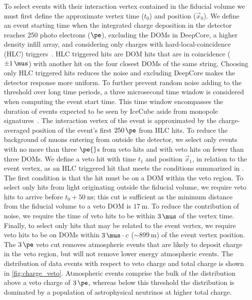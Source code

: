To select events with their interaction vertex contained in the fiducial volume we must first define the approximate vertex time ($t_0$) and position ($\vec{x}_0$).
We define an event starting time when the integrated charge deposition in the detector reaches 250 photo electrons ($\si\pe$), excluding the DOMs in DeepCore, a higher density infill array, and considering only charges with hard-local-coincidence (HLC) triggers~\cite{Achterberg:2006md,Abbasi:2008aa,Aartsen:2016nxy}.
HLC triggered hits are DOM hits that are in coincidence ($\pm\SI{1}\mus$) with another hit on the four closest DOMs of the same string.
Choosing only HLC triggered hits reduces the noise and excluding DeepCore makes the detector response more uniform.
To further prevent random noise adding to the threshold over long time periods, a three microsecond time window is considered when computing the event start time.
This time window encompasses the duration of events expected to be seen by IceCube aside from monopole signatures~\cite{Lauber:2018ntx,Aartsen:2015exf,Aartsen:2014awd}.
The interaction vertex of the event is approximated by the charge-averaged position of the event's first $\SI{250}\pe$ from HLC hits.
To reduce the background of muons entering from outside the detector, we select only events with no more than three $\si\pe{}$s from veto hits and with veto hits on fewer than three DOMs.
We define a veto hit with time $t_1$ and position $\vec{x}_1$, in relation to the event vertex, as an HLC triggered hit that meets the conditions summarized in .
The first condition is that the hit must be on a DOM within the veto region.
To select only hits from light originating outside the fiducial volume, we require veto hits to arrive before $t_0+\SI{50}\ns$; this cut is sufficient as the minimum distance from the fiducial volume to a veto DOM is $\SI{17}\meter$.
To reduce the contribution of noise, we require the time of veto hits to be within $\SI{3}\mus$ of the vertex time.
Finally, to select only hits that may be related to the event vertex, we require veto hits to be on DOMs within $\SI{3}\mus \cdot c$ ($\sim\SI{899}\meter$) of the event vertex position.
The $\SI{3}\pe$ veto cut removes atmospheric events that are likely to deposit charge in the veto region, but will not remove lower energy atmospheric events.
The distribution of data events with respect to veto charge and total charge is shown in \ref{fig:charge_veto}.
Atmospheric events comprise the bulk of the distribution above a veto charge of $\SI{3}\pe$, whereas below this threshold the distribution is dominated by a population of astrophysical neutrinos at higher total charge.

